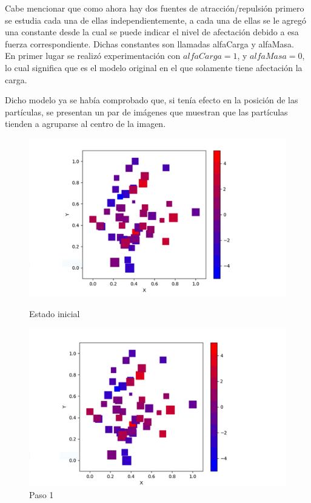 \documentclass{article}
\begin{document}
	Cabe mencionar que como ahora hay dos fuentes de atracción/repulsión primero se estudia cada una de ellas independientemente, a cada una de ellas se le agregó una constante desde la cual se puede indicar el nivel de afectación debido a esa fuerza correspondiente. Dichas constantes son llamadas alfaCarga y alfaMasa.\\
	
	En primer lugar se realizó experimentación con $alfaCarga = 1$, y $alfaMasa = 0$,  lo cual significa que es el modelo original en el que solamente tiene afectación la carga.
	
	Dicho modelo ya se había comprobado que, si tenía efecto en la posición de las partículas, se presentan un par de imágenes que muestran que las partículas tienden a agruparse al centro de la imagen.
	
	\begin{figure}[h!]
		\centering
		\includegraphics[width=0.7\linewidth]{Figure_1.png}
		\caption{Estado inicial}
		\label{fig:imagen1}
		
		\includegraphics[width=0.7\linewidth]{Figure_2.png}
		\caption{Paso 1}
		\label{fig:imagen2}
		
	\end{figure}
	
\end{document}

